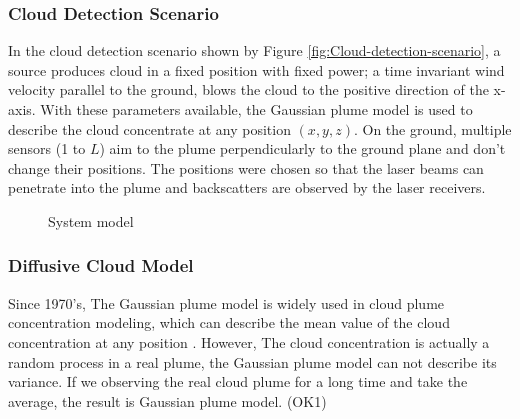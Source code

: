 \subsubsection{Cloud Detection Scenario\label{sub:Cloud-Detection-Scenario}}

In the cloud detection scenario shown by Figure \ref{fig:Cloud-detection-scenario},
a source produces cloud in a fixed position with fixed power; a time
invariant wind velocity parallel to the ground, blows the cloud to
the positive direction of the x-axis. With these parameters available,
the Gaussian plume model \cite{Lin1996}\cite{GPM.JA.2011} is used
to describe the cloud concentrate at any position $\left(x,y,z\right)$.
On the ground, multiple sensors (1 to $L$) aim to the plume perpendicularly
to the ground plane and don't change their positions. The positions
were chosen so that the laser beams can penetrate into the plume and
backscatters are observed by the laser receivers. 

\begin{figure}
\hfill{}\hfill{}\hfill{}

\caption{System model}
\end{figure}





\subsubsection{Diffusive Cloud Model}

Since 1970's, The Gaussian plume model is widely used in cloud plume
concentration modeling, which can describe the mean value of the cloud
concentration at any position \cite{Shieh1972}. However, The cloud
concentration is actually a random process in a real plume, the Gaussian
plume model can not describe its variance. If we observing the real
cloud plume for a long time and take the average, the result is Gaussian
plume model. (OK1)

